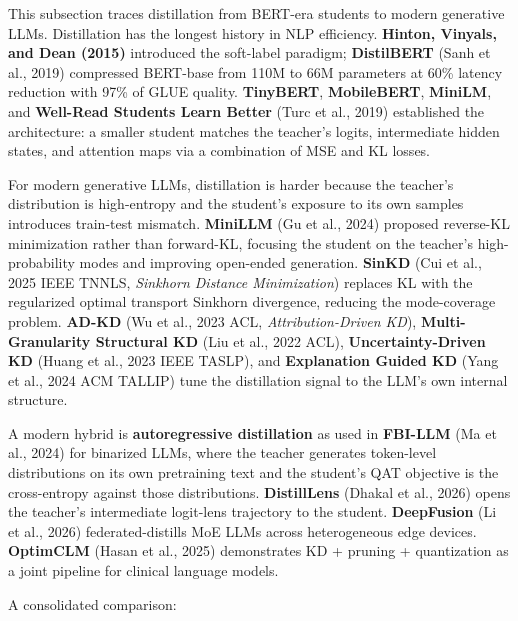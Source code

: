 This subsection traces distillation from BERT-era students to modern generative LLMs. Distillation has the longest history in NLP efficiency. \textbf{Hinton, Vinyals, and Dean (2015)} introduced the soft-label paradigm; \textbf{DistilBERT} (Sanh et al., 2019) compressed BERT-base from 110M to 66M parameters at 60\% latency reduction with 97\% of GLUE quality. \textbf{TinyBERT}, \textbf{MobileBERT}, \textbf{MiniLM}, and \textbf{Well-Read Students Learn Better} (Turc et al., 2019) established the architecture: a smaller student matches the teacher's logits, intermediate hidden states, and attention maps via a combination of MSE and KL losses.

For modern generative LLMs, distillation is harder because the teacher's distribution is high-entropy and the student's exposure to its own samples introduces train-test mismatch. \textbf{MiniLLM} (Gu et al., 2024) proposed reverse-KL minimization rather than forward-KL, focusing the student on the teacher's high-probability modes and improving open-ended generation. \textbf{SinKD} (Cui et al., 2025 IEEE TNNLS, \emph{Sinkhorn Distance Minimization}) replaces KL with the regularized optimal transport Sinkhorn divergence, reducing the mode-coverage problem. \textbf{AD-KD} (Wu et al., 2023 ACL, \emph{Attribution-Driven KD}), \textbf{Multi-Granularity Structural KD} (Liu et al., 2022 ACL), \textbf{Uncertainty-Driven KD} (Huang et al., 2023 IEEE TASLP), and \textbf{Explanation Guided KD} (Yang et al., 2024 ACM TALLIP) tune the distillation signal to the LLM's own internal structure.

A modern hybrid is \textbf{autoregressive distillation} as used in \textbf{FBI-LLM} (Ma et al., 2024) for binarized LLMs, where the teacher generates token-level distributions on its own pretraining text and the student's QAT objective is the cross-entropy against those distributions. \textbf{DistillLens} (Dhakal et al., 2026) opens the teacher's intermediate logit-lens trajectory to the student. \textbf{DeepFusion} (Li et al., 2026) federated-distills MoE LLMs across heterogeneous edge devices. \textbf{OptimCLM} (Hasan et al., 2025) demonstrates KD + pruning + quantization as a joint pipeline for clinical language models.

A consolidated comparison:

